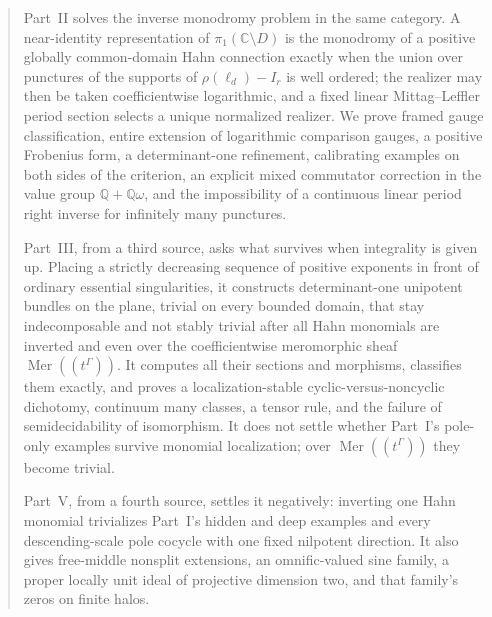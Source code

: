 \documentclass[11pt,letterpaper]{article}
\theoremstyle{definition}
\theoremstyle{remark}
\newcommand{\C}{\mathbb C}
\newcommand{\Q}{\mathbb Q}
\newcommand{\Mer}{\operatorname{Mer}}
\numberwithin{equation}{section}
\begin{document}
\begin{titlepage}
\begin{minipage}{0.94\textwidth}
\begin{abstract}
Part~II solves the inverse monodromy problem in the same category. A
near-identity representation of $\pi_1(\C\setminus D)$ is the monodromy of a
positive globally common-domain Hahn connection exactly when the union over
punctures of the supports of $\rho(\ell_d)-I_r$ is well ordered; the realizer
may then be taken coefficientwise logarithmic, and a fixed linear
Mittag--Leffler period section selects a unique normalized realizer. We prove
framed gauge classification, entire extension of logarithmic comparison
gauges, a positive Frobenius form, a determinant-one refinement, calibrating
examples on both sides of the criterion, an explicit mixed commutator
correction in the value group $\Q+\Q\omega$, and the impossibility of a
continuous linear period right inverse for infinitely many punctures.

Part~III, from a third source, asks what survives when integrality is given
up. Placing a strictly decreasing sequence of positive exponents in front of
ordinary essential singularities, it constructs determinant-one unipotent
bundles on the plane, trivial on every bounded domain, that stay
indecomposable and not stably trivial after all Hahn monomials are inverted
and even over the coefficientwise meromorphic sheaf $\Mer((t^\Gamma))$. It
computes all their sections and morphisms, classifies them exactly, and proves
a localization-stable cyclic-versus-noncyclic dichotomy, continuum many
classes, a tensor rule, and the failure of semidecidability of isomorphism. It
does not settle whether Part~I's pole-only examples survive monomial
localization; over $\Mer((t^\Gamma))$ they become trivial.

Part~V, from a fourth source, settles it negatively: inverting one Hahn monomial
trivializes Part~I's hidden and deep examples and every descending-scale pole
cocycle with one fixed nilpotent direction. It also gives free-middle nonsplit
extensions, an omnific-valued sine family, a proper locally unit ideal of
projective dimension two, and that family's zeros on finite halos.


\end{abstract}
\end{minipage}
\end{titlepage}
\end{document}
